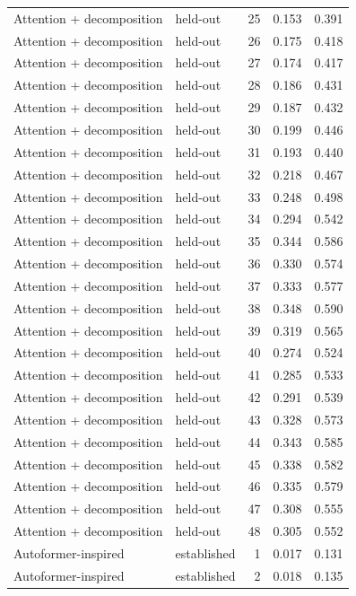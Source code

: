 \begin{tabular}{llrrr}
Attention + decomposition & held-out & 25 & 0.153 & 0.391 \\
Attention + decomposition & held-out & 26 & 0.175 & 0.418 \\
Attention + decomposition & held-out & 27 & 0.174 & 0.417 \\
Attention + decomposition & held-out & 28 & 0.186 & 0.431 \\
Attention + decomposition & held-out & 29 & 0.187 & 0.432 \\
Attention + decomposition & held-out & 30 & 0.199 & 0.446 \\
Attention + decomposition & held-out & 31 & 0.193 & 0.440 \\
Attention + decomposition & held-out & 32 & 0.218 & 0.467 \\
Attention + decomposition & held-out & 33 & 0.248 & 0.498 \\
Attention + decomposition & held-out & 34 & 0.294 & 0.542 \\
Attention + decomposition & held-out & 35 & 0.344 & 0.586 \\
Attention + decomposition & held-out & 36 & 0.330 & 0.574 \\
Attention + decomposition & held-out & 37 & 0.333 & 0.577 \\
Attention + decomposition & held-out & 38 & 0.348 & 0.590 \\
Attention + decomposition & held-out & 39 & 0.319 & 0.565 \\
Attention + decomposition & held-out & 40 & 0.274 & 0.524 \\
Attention + decomposition & held-out & 41 & 0.285 & 0.533 \\
Attention + decomposition & held-out & 42 & 0.291 & 0.539 \\
Attention + decomposition & held-out & 43 & 0.328 & 0.573 \\
Attention + decomposition & held-out & 44 & 0.343 & 0.585 \\
Attention + decomposition & held-out & 45 & 0.338 & 0.582 \\
Attention + decomposition & held-out & 46 & 0.335 & 0.579 \\
Attention + decomposition & held-out & 47 & 0.308 & 0.555 \\
Attention + decomposition & held-out & 48 & 0.305 & 0.552 \\
Autoformer-inspired & established & 1 & 0.017 & 0.131 \\
Autoformer-inspired & established & 2 & 0.018 & 0.135 \\

\end{tabular}

